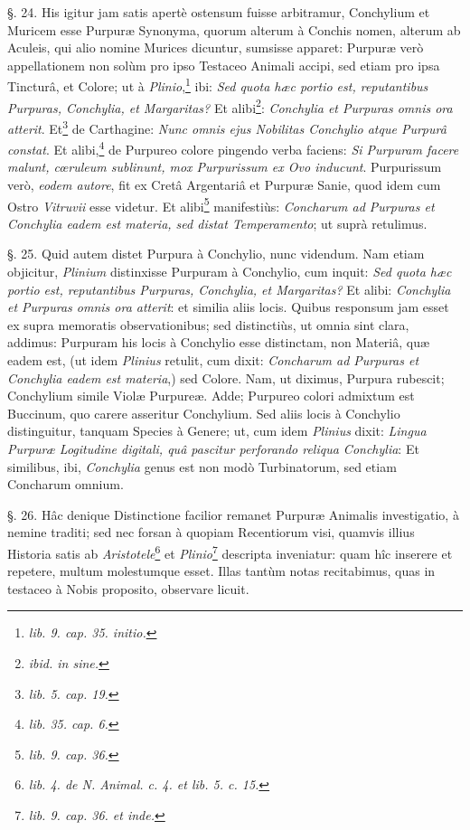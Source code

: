 \documentclass[a4paper, 11pt, oneside, polutonikogreek, german]{article}
\begin{document}
§. 24. His igitur jam satis apertè ostensum fuisse arbitramur, Conchylium et Muricem esse Purpuræ Synonyma, quorum alterum à Conchis nomen, alterum ab Aculeis, qui alio nomine Murices dicuntur, sumsisse apparet: Purpuræ verò appellationem non solùm pro ipso Testaceo Animali accipi, sed etiam pro ipsa Tincturâ, et Colore; ut à \emph{Plinio},\footnote{\emph{lib. 9. cap. 35. initio.}} ibi: \emph{Sed quota hæc portio est, reputantibus Purpuras, Conchylia, et Margaritas?} Et alibi\footnote{\emph{ibid. in sine.}}: \emph{Conchylia et Purpuras omnis ora atterit}. Et\footnote{\emph{lib. 5. cap. 19.}} de Carthagine: \emph{Nunc omnis ejus Nobilitas Conchylio atque Purpurâ constat}. Et alibi,\footnote{\emph{lib. 35. cap. 6.}} de Purpureo colore pingendo verba faciens: \emph{Si Purpuram facere malunt, cœruleum sublinunt, mox Purpurissum ex Ovo inducunt}. Purpurissum verò, \emph{eodem autore}, fit ex Cretâ Argentariâ et Purpuræ Sanie, quod idem cum Ostro \emph{Vitruvii} esse videtur. Et alibi\footnote{\emph{lib. 9. cap. 36.}} manifestiùs: \emph{Concharum ad Purpuras et Conchylia eadem est materia, sed distat Temperamento}; ut suprà retulimus.

§. 25. Quid autem distet Purpura à Conchylio, nunc videndum. Nam etiam objicitur, \emph{Plinium} distinxisse Purpuram à Conchylio, cum inquit: \emph{Sed quota hæc portio est, reputantibus Purpuras, Conchylia, et Margaritas?} Et alibi: \emph{Conchylia et Purpuras omnis ora atterit}: et similia aliis locis. Quibus responsum jam esset ex supra memoratis observationibus; sed distinctiùs, ut omnia sint clara, addimus: Purpuram his locis à Conchylio esse distinctam, non Materiâ, quæ eadem est, (ut idem \emph{Plinius} retulit, cum dixit: \emph{Concharum ad Purpuras et Conchylia eadem est materia},) sed Colore. Nam, ut diximus, Purpura rubescit; Conchylium simile Violæ Purpureæ. Adde; Purpureo colori admixtum est Buccinum, quo carere asseritur Conchylium. Sed aliis locis à Conchylio distinguitur, tanquam Species à Genere; ut, cum idem \emph{Plinius} dixit: \emph{Lingua Purpuræ Logitudine digitali, quâ pascitur perforando reliqua Conchylia}: Et similibus, ibi, \emph{Conchylia} genus est non modò Turbinatorum, sed etiam Concharum omnium.

§. 26. Hâc denique Distinctione facilior remanet Purpuræ Animalis investigatio, à nemine traditi; sed nec forsan à quopiam Recentiorum visi, quamvis illius Historia satis ab \emph{Aristotele}\footnote{\emph{lib. 4. de N. Animal. c. 4. et lib. 5. c. 15.}} et \emph{Plinio}\footnote{\emph{lib. 9. cap. 36. et inde.}} descripta inveniatur: quam hîc inserere et repetere, multum molestumque esset. Illas tantùm notas recitabimus, quas in testaceo à Nobis proposito, observare licuit.
\end{document}
